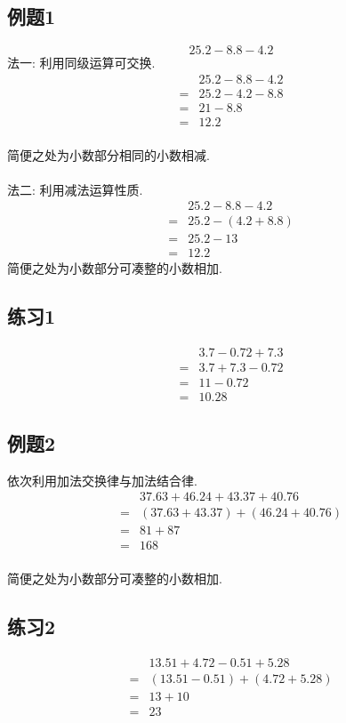 \begin{CJK}{UTF8}{gkai}
\subsection{例题1}
$$25.2-8.8-4.2$$
法一: 利用同级运算可交换.
\begin{align*}
&25.2-8.8-4.2\\
=&25.2-4.2-8.8\\
=&21-8.8\\
=&12.2
\end{align*}\\
简便之处为小数部分相同的小数相减.\\
\vspace{8mm}
\\法二: 利用减法运算性质.
\begin{align*}
&25.2-8.8-4.2\\
=&25.2-(4.2+8.8)\\
=&25.2-13\\
=&12.2
\end{align*}
简便之处为小数部分可凑整的小数相加.

\subsection{练习1}
\begin{align*}
&3.7-0.72+7.3\\
=&3.7+7.3-0.72\\
=&11-0.72\\
=&10.28
\end{align*}

\subsection{例题2}
依次利用加法交换律与加法结合律.
\begin{align*}
&37.63+46.24+43.37+40.76\\
=&(37.63+43.37)+(46.24+40.76)\\
=&81+87\\
=&168
\end{align*}\\
简便之处为小数部分可凑整的小数相加.

\subsection{练习2}
\begin{align*}
&13.51+4.72-0.51+5.28\\
=&(13.51-0.51)+(4.72+5.28)\\
=&13+10\\
=&23
\end{align*}


\end{CJK}
